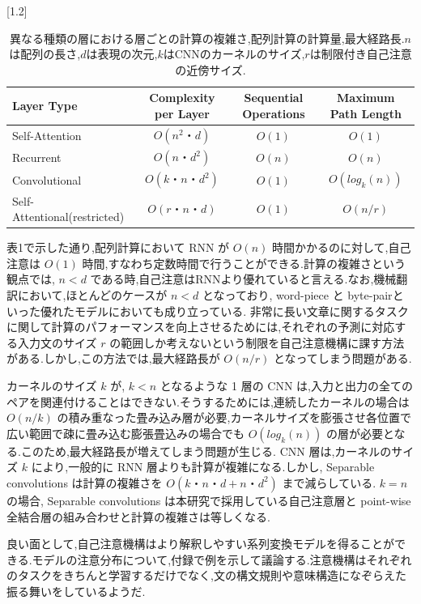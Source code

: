 \documentclass{jarticle}     %
\begin{document}
\begin{table}[hbtp]
  \caption{異なる種類の層における層ごとの計算の複雑さ,配列計算の計算量,最大経路長.$n$は配列の長さ,$d$は表現の次元,$k$はCNNのカーネルのサイズ,$r$は制限付き自己注意の近傍サイズ.}
  \label{table:path length}
  \small
  \centering
  \scalebox{1.2}[1.2]{
    \begin{tabular}{lccc}
      \hline
      Layer Type  & Complexity per Layer  &  Sequential Operations & Maximum Path Length \\
      \hline 
      Self-Attention  & $O(n^2・d)$  & $O(1)$ & $O(1)$ \\
      Recurrent  & $O(n・d^2)$   & $O(n)$ & $O(n)$ \\
      Convolutional  & $O(k・n・d^2)$  & $O(1)$ & $O(log_k(n))$ \\
      Self-Attentional(restricted)  &  $O(r・n・d)$  &  $O(1)$ & $O(n/r)$ \\
      \hline
    \end{tabular}
  }
  
\end{table}

表1で示した通り,配列計算において RNN が $O(n)$ 時間かかるのに対して,自己注意は $O(1)$ 時間,すなわち定数時間で行うことができる.計算の複雑さという観点では, $n < d$ である時,自己注意はRNNより優れていると言える.なお,機械翻訳において,ほとんどのケースが $n < d$ となっており, word-piece\cite{31} と byte-pair\cite{25}といった優れたモデルにおいても成り立っている.
非常に長い文章に関するタスクに関して計算のパフォーマンスを向上させるためには,それぞれの予測に対応する入力文のサイズ $r$ の範囲しか考えないという制限を自己注意機構に課す方法がある.しかし,この方法では,最大経路長が $O(n/r)$ となってしまう問題がある.
\par
カーネルのサイズ $k$ が, $k<n$ となるような 1 層の CNN は,入力と出力の全てのペアを関連付けることはできない.そうするためには,連続したカーネルの場合は $O(n/k)$ の積み重なった畳み込み層が必要,カーネルサイズを膨張させ各位置で広い範囲で疎に畳み込む膨張畳込み\cite{15,膨張畳込み}の場合でも $O(log_k(n))$ の層が必要となる.このため,最大経路長が増えてしまう問題が生じる. CNN 層は,カーネルのサイズ $k$ により,一般的に RNN 層よりも計算が複雑になる.しかし, Separable convolutions\cite{6} は計算の複雑さを $O(k・n・d + n・d^2)$ まで減らしている. $k=n$ の場合, Separable convolutions は本研究で採用している自己注意層と point-wise 全結合層の組み合わせと計算の複雑さは等しくなる.
\par
良い面として,自己注意機構はより解釈しやすい系列変換モデルを得ることができる.モデルの注意分布について,付録で例を示して議論する.注意機構はそれぞれのタスクをきちんと学習するだけでなく,文の構文規則や意味構造になぞらえた振る舞いをしているようだ.
\end{document}
